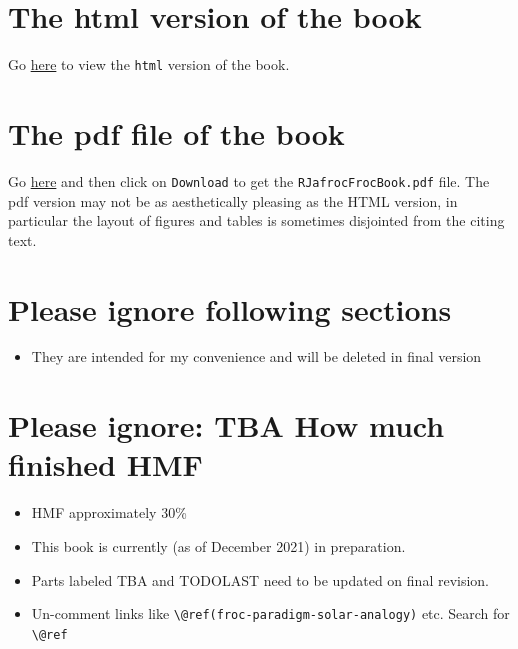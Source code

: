 \documentclass[
]{book}
\providecommand{\tightlist}{%
  \setlength{\itemsep}{0pt}\setlength{\parskip}{0pt}}
\begin{document}
\hypertarget{the-html-version-of-the-book}{%
\section*{The html version of the book}\label{the-html-version-of-the-book}}

Go \href{https://dpc10ster.github.io/RJafrocFrocBook/}{here} to view the \texttt{html} version of the book.

\hypertarget{the-pdf-file-of-the-book}{%
\section*{The pdf file of the book}\label{the-pdf-file-of-the-book}}

Go \href{https://github.com/dpc10ster/RJafrocFrocBook/blob/gh-pages/RJafrocFrocBook.pdf}{here} and then click on \texttt{Download} to get the \texttt{RJafrocFrocBook.pdf} file. The pdf version may not be as aesthetically pleasing as the HTML version, in particular the layout of figures and tables is sometimes disjointed from the citing text.

\hypertarget{please-ignore-following-sections}{%
\section*{Please ignore following sections}\label{please-ignore-following-sections}}

\begin{itemize}
\tightlist
\item
  They are intended for my convenience and will be deleted in final version
\end{itemize}

\hypertarget{please-ignore-tba-how-much-finished-hmf}{%
\section*{Please ignore: TBA How much finished HMF}\label{please-ignore-tba-how-much-finished-hmf}}

\begin{itemize}
\tightlist
\item
  HMF approximately 30\%
\item
  This book is currently (as of December 2021) in preparation.
\item
  Parts labeled TBA and TODOLAST need to be updated on final revision.
\item
  Un-comment links like \texttt{\textbackslash{}@ref(froc-paradigm-solar-analogy)} etc. Search for \texttt{\textbackslash{}@ref}
\end{itemize}
\end{document}
